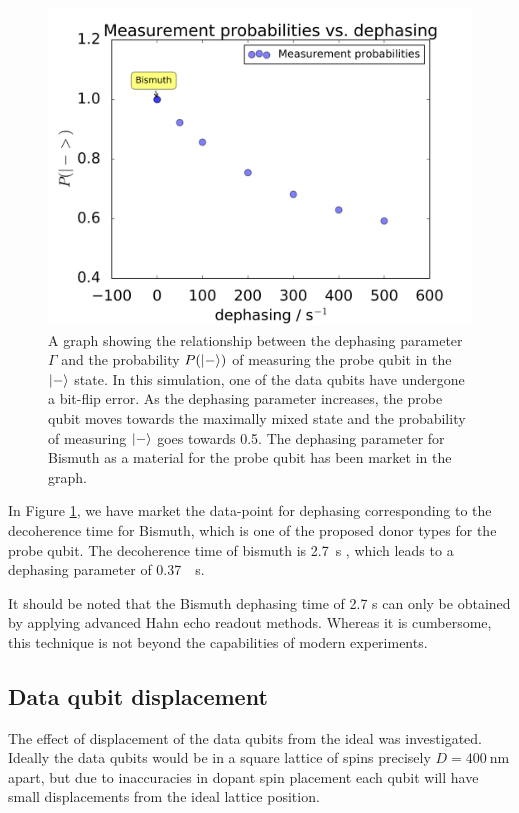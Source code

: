 \documentclass[%
 reprint,
 amsmath,amssymb,
 aps,
]{revtex4-1}
\begin{document}
\begin{figure}[!ht]
	\centering
	\includegraphics[width=\textwidth]{Figures/phase_graph.png}
		\caption{A graph showing the relationship between the dephasing parameter $\Gamma$ and the probability $P(\ket{-})$ of measuring the probe qubit in the $\ket{-}$ state. In this simulation, one of the data qubits have undergone a bit-flip error. As the dephasing parameter increases, the probe qubit moves towards the maximally mixed state and the probability of measuring $\ket{-}$ goes towards 0.5. The dephasing parameter for Bismuth as a material for the probe qubit has been market in the graph.}
		\label{fig:phaseplot}
\end{figure}


In Figure \ref{fig:phaseplot}, we have market the data-point for dephasing corresponding to the decoherence time for Bismuth, which is one of the proposed donor types for the probe qubit. The decoherence time of bismuth is \SI{2.7}{\second} \cite{Wolfowicz2013}, which leads to a dephasing parameter of \SI{0.37}{\per\second}. 


It should be noted that the Bismuth dephasing time of 2.7 s can only be obtained by applying advanced Hahn echo readout methods. Whereas it is cumbersome, this technique is not beyond the capabilities of modern experiments. 

\subsection{Data qubit displacement}
The effect of displacement of the data qubits from the ideal was investigated. Ideally the data qubits would be in a square lattice of spins precisely $D = \SI{400}{\nano\metre}$ apart, but due to inaccuracies in dopant spin placement each qubit will have small displacements from the ideal lattice position.
\end{document}
